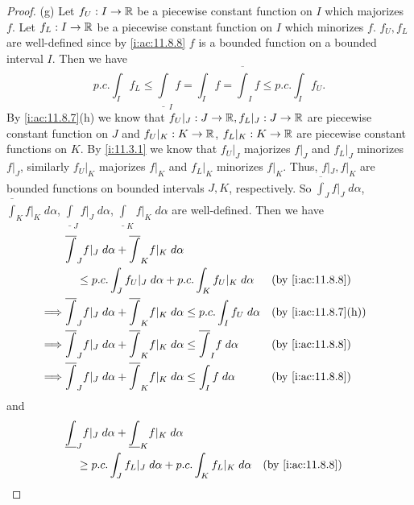 \begin{proof}{(g)}
  Let \(f_U : I \to \mathbb{R}\) be a piecewise constant function on \(I\) which majorizes \(f\).
  Let \(f_L : I \to \mathbb{R}\) be a piecewise constant function on \(I\) which minorizes \(f\).
  \(f_U, f_L\) are well-defined since by \cref{i:ac:11.8.8} \(f\) is a bounded function on a bounded interval \(I\).
  Then we have
  \[
    p.c. \int_I f_L \leq \underline{\int}_I f = \int_I f = \overline{\int}_I f \leq p.c. \int_I f_U.
  \]
  By \cref{i:ac:11.8.7}(h) we know that \(f_U|_J : J \to \mathbb{R}, f_L|_J : J \to \mathbb{R}\) are piecewise constant function on \(J\) and \(f_U|_K : K \to \mathbb{R}\), \(f_L|_K : K \to \mathbb{R}\) are piecewise constant functions on \(K\).
  By \cref{i:11.3.1} we know that \(f_U|_J\) majorizes \(f|_J\) and \(f_L|_J\) minorizes \(f|_J\), similarly \(f_U|_K\) majorizes \(f|_K\) and \(f_L|_K\) minorizes \(f|_K\).
  Thus, \(f|_J, f|_K\) are bounded functions on bounded intervals \(J, K\), respectively.
  So \(\overline{\int}_J f|_J \; d \alpha\), \(\overline{\int}_K f|_K \; d \alpha\), \(\underline{\int}_J f|_J \; d \alpha\), \(\underline{\int}_K f|_K \; d \alpha\) are well-defined.
  Then we have
  \begin{align*}
             & \overline{\int}_J f|_J \; d \alpha + \overline{\int}_K f|_K \; d \alpha                                                               \\
             & \quad \leq p.c. \int_J f_U|_J \; d \alpha + p.c. \int_K f_U|_K \; d \alpha                                   &  & \by{i:ac:11.8.8}    \\
    \implies & \overline{\int}_J f|_J \; d \alpha + \overline{\int}_K f|_K \; d \alpha \leq p.c. \int_I f_U \; d \alpha     &  & \by{i:ac:11.8.7}[h] \\
    \implies & \overline{\int}_J f|_J \; d \alpha + \overline{\int}_K f|_K \; d \alpha \leq \overline{\int}_I f \; d \alpha &  & \by{i:ac:11.8.8}    \\
    \implies & \overline{\int}_J f|_J \; d \alpha + \overline{\int}_K f|_K \; d \alpha \leq \int_I f \; d \alpha            &  & \by{i:ac:11.8.8}
  \end{align*}
  and
  \begin{align*}
             & \underline{\int}_J f|_J \; d \alpha + \underline{\int}_K f|_K \; d \alpha                                                                \\
             & \quad \geq p.c. \int_J f_L|_J \; d \alpha + p.c. \int_K f_L|_K \; d \alpha                                      &  & \by{i:ac:11.8.8}    \\

\end{align*}
\end{proof}
